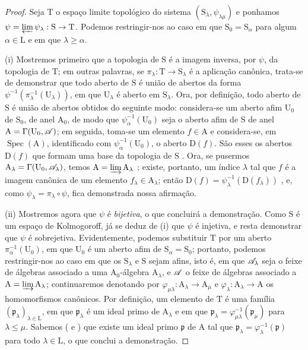 \begin{proof}
Seja $\mathrm{T}$ o espaço limite topológico do sistema $(\mathrm{S}_\lambda,\psi_{\lambda\mu})$ e ponhamos $\psi=\varprojlim\psi_\lambda:\mathrm{S}\to\mathrm{T}$.
Podemos restringir-nos ao caso em que $\mathrm{S}_0=\mathrm{S}_\alpha$ para algum $\alpha\in\mathrm{L}$ e em que $\lambda\geqslant\alpha$.

\medskip
\noindent
(i) Mostremos primeiro que a topologia de $\mathrm{S}$ é a imagem inversa, por $\psi$, da topologia de $\mathrm{T}$; em outras palavras, se $\pi_\lambda:\mathrm{T}\to\mathrm{S}_\lambda$ é a aplicação canônica, trata-se de demonstrar que todo aberto de $\mathrm{S}$ é união de abertos da forma $\psi^{-1}(\pi_\lambda^{-1}(\mathrm{U}_\lambda))$, em que $\mathrm{U}_\lambda$ é aberto em $\mathrm{S}_\lambda$.
Ora, por definição, todo aberto de $\mathrm{S}$ é união de abertos obtidos do seguinte modo: considera-se um aberto afim $\mathrm{U}_0$ de $\mathrm{S}_0$, de anel $\mathrm{A}_0$, de modo que $\psi_\alpha^{-1}(\mathrm{U}_0)$ seja o aberto afim de $\mathrm{S}$ de anel $\mathrm{A}=\Gamma(\mathrm{U}_0,\mathscr{A})$; em seguida, toma-se um elemento $f\in\mathrm{A}$ e considera-se, em $\operatorname{Spec}(\mathrm{A})$, identificado com $\psi_\alpha^{-1}(\mathrm{U}_0)$, o aberto $\mathrm{D}(f)$.
São esses os abertos $\mathrm{D}(f)$ que formam uma base da topologia de $\mathrm{S}$ .
Ora, se pusermos $\mathrm{A}_\lambda=\Gamma(\mathrm{U}_0,\mathscr{A}_\lambda)$, temos $\mathrm{A}=\varinjlim\mathrm{A}_\lambda$ ; existe, portanto, um índice $\lambda$ tal que $f$ é a imagem canônica de um elemento $f_\lambda\in\mathrm{A}_\lambda$; então $\mathrm{D}(f)=\psi_\lambda^{-1}(\mathrm{D}(f_\lambda))$ , e, como $\psi_\lambda=\pi_\lambda\circ\psi$, fica demonstrada nossa afirmação.

\medskip
\noindent
(ii) Mostremos agora que $\psi$ é \emph{bijetiva}, o que concluirá a demonstração.
Como $\mathrm{S}$ é um espaço de Kolmogoroff, já se deduz de (i) que $\psi$ é injetiva, e resta demonstrar que $\psi$ é sobrejetiva.
Evidentemente, podemos substituir $\mathrm{T}$ por um aberto $\pi_\alpha^{-1}(\mathrm{U}_0)$, em que $\mathrm{U}_0$ é um aberto afim de $\mathrm{S}_\alpha=\mathrm{S}_0$; portanto, podemos restringir-nos ao caso em que os $\mathrm{S}_\lambda$ e $\mathrm{S}$ sejam afins, isto é, em que $\mathscr{A}_\lambda$ seja o feixe de álgebras associado a uma $\mathrm{A}_0$-álgebra $\mathrm{A}_\lambda$, e $\mathscr{A}$ o feixe de álgebras associado a $\mathrm{A}=\varinjlim\mathrm{A}_\lambda$; continuaremos denotando por $\varphi_{\mu\lambda}:\mathrm{A}_\lambda\to\mathrm{A}_\mu$ e $\varphi_\lambda:\mathrm{A}_\lambda\to\mathrm{A}$ os homomorfismos canônicos.
Por definição, um elemento de $\mathrm{T}$ é uma família $(\mathfrak{p}_\lambda)_{\lambda\in\mathrm{L}}$, em que $\mathfrak{p}_\lambda$ é um ideal primo de $\mathrm{A}_\lambda$ e em que $\mathfrak{p}_\lambda=\varphi_{\mu\lambda}^{-1}(\mathfrak{p}_\mu)$ para $\lambda\leqslant\mu$.
Sabemos ( e ) que existe um ideal primo $\mathfrak{p}$ de $\mathrm{A}$ tal que $\mathfrak{p}_\lambda=\varphi_\lambda^{-1}(\mathfrak{p})$ para todo $\lambda\in\mathrm{L}$, o que conclui a demonstração.
\end{proof}

